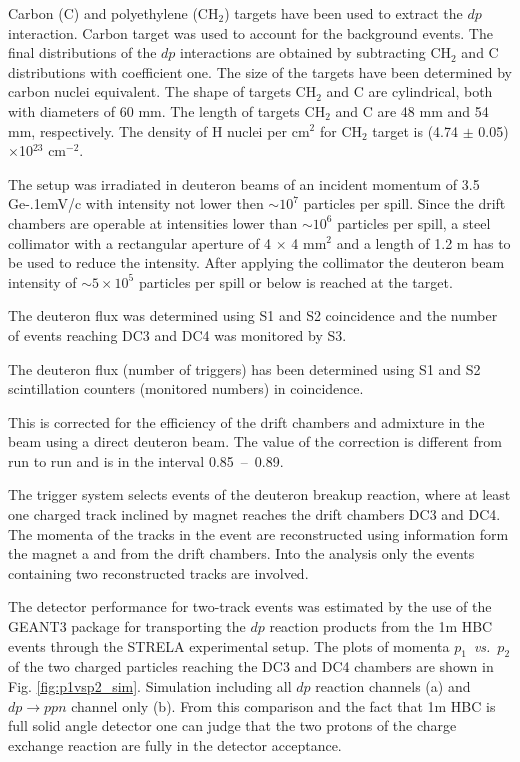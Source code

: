 \documentclass[twocolumn,epjc3]{svjour3}
\newcommand{\dpfrag} {\ensuremath{dp \rightarrow ppn}\xspace}
\newcommand{\GeVc}   {Ge\kern-.1emV/c\xspace}
\begin{document}
Carbon (C) and polyethylene (CH$_2$) targets have been used to extract the $dp$
interaction. Carbon target was used to account for the background events. The
final distributions of the $dp$ interactions are obtained by subtracting CH$_2$
and C distributions with coefficient one. The size of the targets have been
determined by carbon nuclei equivalent. The shape of targets CH$_2$ and C are
cylindrical, both with diameters of 60 mm. The length of targets CH$_2$ and C
are 48 mm and 54 mm, respectively. The density of H nuclei per cm$^2$ for CH$_2$
target is (4.74 $\pm$ 0.05)$\times$10$^{23}$ cm$^{-2}$.

The setup was irradiated in deuteron beams of an incident momentum of 3.5 \GeVc
with intensity not lower then $\sim 10^{7}$ particles per spill. Since the drift
chambers are operable at intensities lower than $\sim 10^{6}$ particles per
spill, a steel collimator with a rectangular aperture of 4 $\times$ 4 mm$^2$ and
a length of 1.2 m has to be used to reduce the intensity. After applying the
collimator the deuteron beam intensity of $\sim 5\times10^5$ particles per spill
or below is reached at the target.

The deuteron flux was determined using S1 and S2 coincidence and the number of
events reaching DC3 and DC4 was monitored by S3.

The deuteron flux (number of triggers) has
been determined using S1 and S2 scintillation counters (monitored numbers) in
coincidence.


This is corrected for the efficiency of the drift chambers and
admixture in the beam using a direct deuteron beam. The value of the correction
is different from run to run and is in the interval 0.85~--~0.89.

The trigger system selects events of the deuteron breakup reaction, where at
least one charged track inclined by magnet reaches the drift chambers DC3 and
DC4. The momenta of the tracks in the event are reconstructed using information
form the magnet a and from the drift chambers. Into the analysis only the events
containing two reconstructed tracks are involved.

The detector performance for two-track events was estimated by the use of the
GEANT3 package for transporting the $dp$ reaction products from the 1m HBC
events through the STRELA experimental setup. The plots of momenta
$p_1$~\textit{vs.}~$p_2$ of the two charged particles reaching the DC3 and DC4
chambers are shown in Fig. \ref{fig:p1vsp2_sim}. Simulation including all $dp$
reaction channels (a) and \dpfrag channel only (b). From this comparison and the
fact that 1m HBC is full solid angle detector one can judge that the two protons
of the charge exchange reaction are fully in the detector acceptance.
\end{document}
